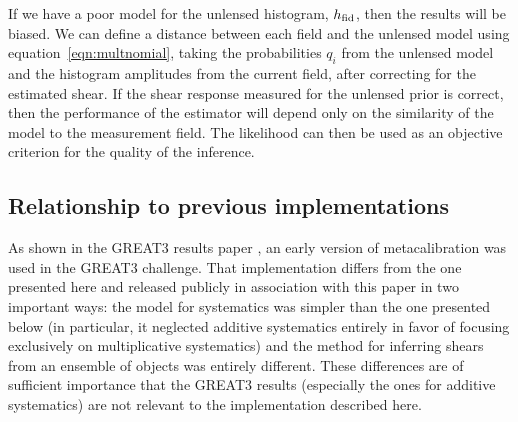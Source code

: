 \documentclass[iop]{emulateapj}
\newcommand\rmcomment[1]{\textcolor{red}{(RM: #1)}}
\begin{document}

If we have a poor model for the unlensed histogram, $h_{\rm fid}$,
then the results will be biased. We can define a distance between each
field and the unlensed model using equation~\ref{eqn:multnomial},
taking the probabilities $q_i$ from the unlensed model and the
histogram amplitudes from the current field, after correcting for the
estimated shear. If the shear response measured for the unlensed prior
is correct, then the performance of the estimator will depend only on
the similarity of the model to the measurement field. The likelihood
can then be used as an objective criterion for the quality of the
inference.

\subsection{Relationship to previous implementations}

As shown in the GREAT3 results paper \citep{2015MNRAS.450.2963M}, an
early version of metacalibration was used in the GREAT3 challenge.
That implementation differs from the one presented here and released
publicly in association with this paper in two important ways: the
model for systematics was simpler than the one presented below (in
particular, it neglected additive systematics entirely in favor of focusing exclusively on
multiplicative systematics) and the method
for inferring shears from an ensemble of objects was entirely
different.  These differences are of sufficient importance that the
GREAT3 results (especially the ones for additive systematics) are not
relevant to the implementation described here.
\end{document}
